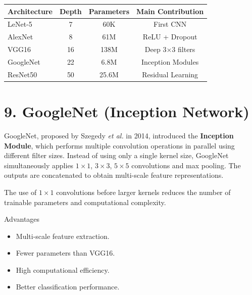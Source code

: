 \documentclass[11pt]{article}
\begin{document}
\begin{center}

\begin{tabular}{|l|c|c|c|}

\hline

Architecture &
Depth &
Parameters &
Main Contribution\\

\hline

LeNet-5 &
7 &
60K &
First CNN\\

AlexNet &
8 &
61M &
ReLU + Dropout\\

VGG16 &
16 &
138M &
Deep 3$\times$3 filters\\

GoogleNet &
22 &
6.8M &
Inception Modules\\

ResNet50 &
50 &
25.6M &
Residual Learning\\

\hline

\end{tabular}

\end{center}

\section*{9. GoogleNet (Inception Network)}

GoogleNet, proposed by Szegedy \textit{et al.} in 2014, introduced the
\textbf{Inception Module}, which performs multiple convolution operations
in parallel using different filter sizes. Instead of using only a single
kernel size, GoogleNet simultaneously applies $1\times1$, $3\times3$,
$5\times5$ convolutions and max pooling. The outputs are concatenated to
obtain multi-scale feature representations.

The use of $1\times1$ convolutions before larger kernels reduces the
number of trainable parameters and computational complexity.

Advantages

\begin{itemize}
\item Multi-scale feature extraction.
\item Fewer parameters than VGG16.
\item High computational efficiency.
\item Better classification performance.
\end{itemize}
\end{document}
